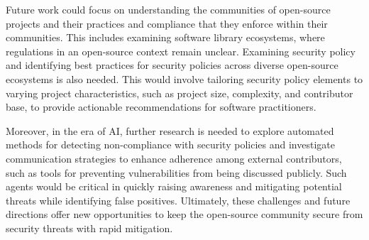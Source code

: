 
Future work could focus on understanding the communities of open-source projects and their practices and compliance that they enforce within their communities. This includes examining software library ecosystems, where regulations in an open-source context remain unclear. Examining security policy and identifying best practices for security policies across diverse open-source ecosystems is also needed. This would involve tailoring security policy elements to varying project characteristics, such as project size, complexity, and contributor base, to provide actionable recommendations for software practitioners. 

Moreover, in the era of AI, further research is needed to explore automated methods for detecting non-compliance with security policies and investigate communication strategies to enhance adherence among external contributors, such as tools for preventing vulnerabilities from being discussed publicly. Such agents would be critical in quickly raising awareness and mitigating potential threats while identifying false positives. Ultimately, these challenges and future directions offer new opportunities to keep the open-source community secure from security threats with rapid mitigation.


